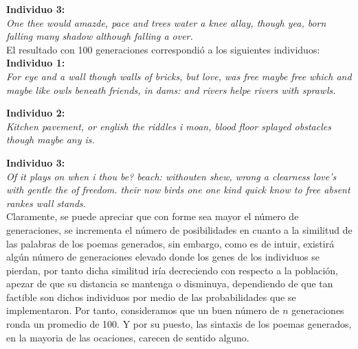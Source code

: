 \documentclass[journal]{IEEEtran}
\begin{document}
\begin{itemize}
	\textbf{Individuo 3:} \\
	\textit{One thee would amazde, pace and trees water a knee allay, though yea, born falling many shadow although falling a over.} \\
	
	El resultado con 100 generaciones correspondió a los siguientes individuos: \\
	
	\textbf{Individuo 1:} \\
	\textit{For eye and a wall though walls of bricks, but love, was free maybe free which and maybe like owls beneath friends, in dams: and rivers helpe rivers with sprawls.}
	
	\newpage
	\textbf{Individuo 2:} \\
	\textit{Kitchen pavement, or english the riddles i moan, blood floor splayed obstacles though maybe any is.}
	
	\textbf{Individuo 3:} \\
	\textit{Of it plays on when i thou be? beach: withouten shew, wrong a clearness love's with gentle the of freedom. their now birds one one kind quick know to free absent rankes wall stands.} \\
	
	Claramente, se puede apreciar que con forme sea mayor el número de generaciones, se incrementa el número de posibilidades en cuanto a la similitud de las palabras de los poemas generados, 
	sin embargo, como es de intuir, existirá algún número de generaciones elevado donde los genes de los individuos se pierdan, por tanto dicha similitud iría decreciendo con respecto
	a la población, apezar de que su distancia se mantenga o disminuya, dependiendo de que tan factible son dichos individuos por medio de las probabilidades que se implementaron. 
	Por tanto, consideramos que un buen número de $ n $ generaciones ronda un promedio de 100. Y por su puesto, las sintaxis de los poemas generados, en la mayoria de las ocaciones, 
	carecen de sentido alguno.
\end{itemize}

\newpage
\end{document}
